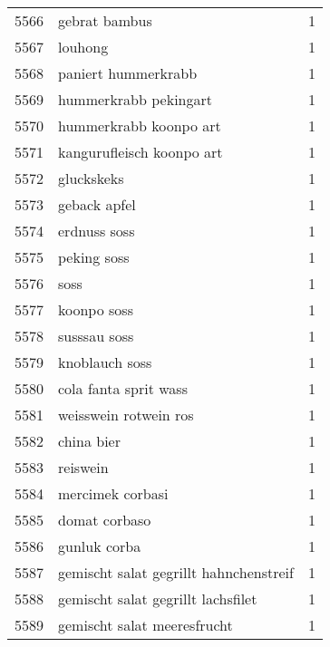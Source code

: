 \begin{tabular}{llr}
5566 &                                      gebrat bambus &      1 \\
5567 &                                            louhong &      1 \\
5568 &                                paniert hummerkrabb &      1 \\
5569 &                              hummerkrabb pekingart &      1 \\
5570 &                             hummerkrabb koonpo art &      1 \\
5571 &                          kangurufleisch koonpo art &      1 \\
5572 &                                         gluckskeks &      1 \\
5573 &                                       geback apfel &      1 \\
5574 &                                       erdnuss soss &      1 \\
5575 &                                        peking soss &      1 \\
5576 &                                               soss &      1 \\
5577 &                                        koonpo soss &      1 \\
5578 &                                       susssau soss &      1 \\
5579 &                                     knoblauch soss &      1 \\
5580 &                              cola fanta sprit wass &      1 \\
5581 &                              weisswein rotwein ros &      1 \\
5582 &                                         china bier &      1 \\
5583 &                                           reiswein &      1 \\
5584 &                                   mercimek corbasi &      1 \\
5585 &                                      domat corbaso &      1 \\
5586 &                                       gunluk corba &      1 \\
5587 &             gemischt salat gegrillt hahnchenstreif &      1 \\
5588 &                 gemischt salat gegrillt lachsfilet &      1 \\
5589 &                        gemischt salat meeresfrucht &      1 \\

\end{tabular}
